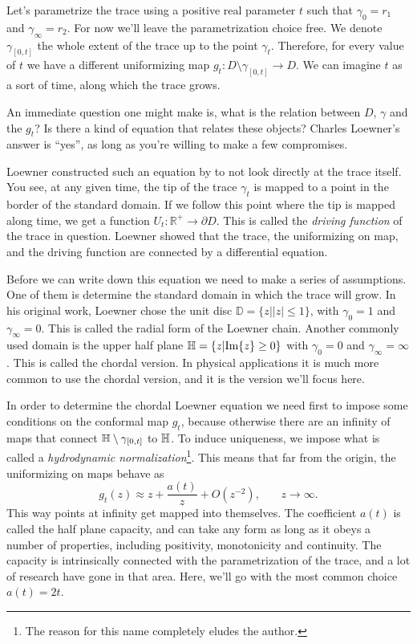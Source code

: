 Let's parametrize the trace using a positive real parameter $t$ such that
$\gamma_{0}=r_1$ and $\gamma_{\infty}=r_2$. For now we'll leave the
parametrization choice free. We denote $\gamma_{[0,t]}$ the whole extent of the
trace up to the point $\gamma_t$. Therefore, for every value of $t$ we have a
different uniformizing map $g_t:D\setminus\gamma_{[0,t]}\rightarrow D$. We can
imagine $t$ as a sort of time, along which the trace grows.

An immediate question one might make is, what is the relation between $D$,
$\gamma$ and the $g_t$? Is there a kind of equation that relates these objects?
Charles Loewner's answer is ``yes'', as long as you're willing to make a few
compromises.

Loewner constructed such an equation by to not look directly at the trace
itself. You see, at any given time, the tip of the trace $\gamma_t$ is mapped
to a point in the border of the standard domain. If we follow this point where
the tip is mapped along time, we get a function
$U_t:\mathbb{R}^+\rightarrow\partial D$. This is called the \textit{driving
function} of the trace in question. Loewner showed that the trace, the
uniformizing on map, and the driving function are connected by a differential
equation.

Before we can write down this equation we need to make a series of assumptions.
One of them is determine the standard domain in which the trace will grow. In
his original work, Loewner chose the unit disc $\mathbb{D}=\{z||z|\leq1\}$,
with $\gamma_0=1$ and $\gamma_\infty=0$. This is called the radial form of the
Loewner chain. Another commonly used domain is the upper half plane
$\mathbb{H}=\{z|\mbox{Im}\{z\}\geq0\}$ with $\gamma_0=0$ and $\gamma_\infty=\infty$.
This is called the chordal version. In physical applications it is much more
common to use the chordal version, and it is the version we'll focus here.

In order to determine the chordal Loewner equation we need first to impose some
conditions on the conformal map $g_t$, because otherwise there are an infinity
of maps that connect $\mathbb{H}\setminus\gamma_{[0,t]}$ to $\mathbb{H}$. To induce
uniqueness, we impose what is called a \textit{hydrodynamic
normalization}\footnote{The reason for this name completely eludes the
author.}. This means that far from the origin, the uniformizing on maps
behave as
\begin{equation}
    \label{eq:hydro}
    g_{t}\left(z\right)\approx
    z+\frac{a\left(t\right)}{z}+O\left(z^{-2}\right)
    ,\,\,\,\,\,\,\,\,\,\,\,
    z\rightarrow\infty.
\end{equation}
This way points at infinity get mapped into themselves. The coefficient $a(t)$
is called the half plane capacity, and can take any form as long as it obeys a
number of properties, including positivity, monotonicity and continuity. The
capacity is intrinsically connected with the parametrization of the trace, and
a lot of research have gone in that area. Here, we'll go with the most common
choice $a(t)=2t$.


